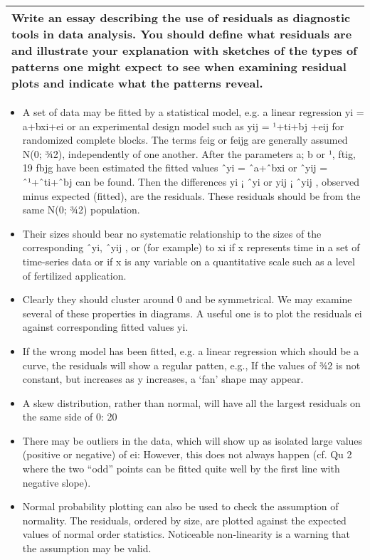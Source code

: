 \documentclass[a4paper,12pt]{article}
\begin{document}
\begin{table}[ht!]
 \centering
 \begin{tabular}{|p{15cm}|}
 \hline  
Write an essay describing the use of residuals as  diagnostic tools in data analysis. You should define what residuals are and illustrate your explanation with sketches of the types of patterns one might expect to see when examining residual plots and indicate what the patterns reveal.
\\ \hline
  \end{tabular}
\end{table}
\begin{itemize}
    \item A set of data may be fitted by a statistical model, e.g. a linear regression yi =
a+bxi+ei or an experimental design model such as yij = ¹+ti+bj +eij for
randomized complete blocks. The terms feig or feijg are generally assumed
N(0; ¾2), independently of one another. After the parameters a; b or ¹, ftig,
19
fbjg have been estimated the fitted values ˆyi = ˆa+ˆbxi or ˆyij = ˆ¹+ˆti+ˆbj can
be found. Then the differences yi ¡ ˆyi or yij ¡ ˆyij , observed minus expected
(fitted), are the residuals. These residuals should be from the same N(0; ¾2)
population. 
\item Their sizes should bear no systematic relationship to the sizes
of the corresponding ˆyi, ˆyij , or (for example) to xi if x represents time in a
set of time-series data or if x is any variable on a quantitative scale such as
a level of fertilized application.
\item Clearly they should cluster around 0 and be
symmetrical. We may examine several of these properties in diagrams. A
useful one is to plot the residuals ei against corresponding fitted values yi.
\item If the wrong model has been fitted, e.g. a linear regression which should be
a curve, the residuals will show a regular patten, e.g.,
If the values of ¾2 is not constant, but increases as y increases, a ‘fan’ shape
may appear.
\item A skew distribution, rather than normal, will have all the largest residuals
on the same side of 0:
20
\item There may be outliers in the data, which will show up as isolated large values
(positive or negative) of ei:
However, this does not always happen (cf. Qu 2 where the two “odd” points
can be fitted quite well by the first line with negative slope). 
\item Normal probability
plotting can also be used to check the assumption of normality. The
residuals, ordered by size, are plotted against the expected values of normal
order statistics. Noticeable non-linearity is a warning that the assumption
may be valid.
\end{itemize}
\end{document}
